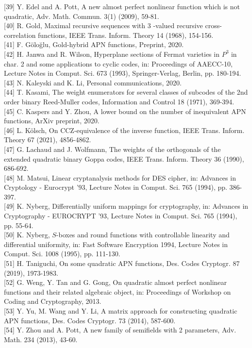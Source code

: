\documentclass[10pt]{article}
\begin{document}
[39] Y. Edel and A. Pott, A new almost perfect nonlinear function which is not quadratic, Adv. Math. Commun. 3(1) (2009), 59-81.\\[0pt]
[40] R. Gold, Maximal recursive sequences with 3 -valued recursive cross-correlation functions, IEEE Trans. Inform. Theory 14 (1968), 154-156.\\[0pt]
[41] F. Göloğlu, Gold-hybrid APN functions, Preprint, 2020.\\[0pt]
[42] H. Janwa and R. Wilson, Hyperplane sections of Fermat varieties in $P^{3}$ in char. 2 and some applications to cyclic codes, in: Proceedings of AAECC-10, Lecture Notes in Comput. Sci. 673 (1993), Springer-Verlag, Berlin, pp. 180-194.\\[0pt]
[43] N. Kaleyski and K. Li, Personal communications, 2020.\\[0pt]
[44] T. Kasami, The weight enumerators for several classes of subcodes of the 2nd order binary Reed-Muller codes, Information and Control 18 (1971), 369-394.\\[0pt]
[45] C. Kaspers and Y. Zhou, A lower bound on the number of inequivalent APN functions, ArXiv preprint, 2020.\\[0pt]
[46] L. Kölsch, On CCZ-equivalence of the inverse function, IEEE Trans. Inform. Theory 67 (2021), 4856-4862.\\[0pt]
[47] G. Lachaud and J. Wolfmann, The weights of the orthogonals of the extended quadratic binary Goppa codes, IEEE Trans. Inform. Theory 36 (1990), 686-692.\\[0pt]
[48] M. Matsui, Linear cryptanalysis methods for DES cipher, in: Advances in Cryptology - Eurocrypt '93, Lecture Notes in Comput. Sci. 765 (1994), pp. 386-397.\\[0pt]
[49] K. Nyberg, Differentially uniform mappings for cryptography, in: Advances in Cryptography - EUROCRYPT '93, Lecture Notes in Comput. Sci. 765 (1994), pp. 55-64.\\[0pt]
[50] K. Nyberg, $S$-boxes and round functions with controllable linearity and differential uniformity, in: Fast Software Encryption 1994, Lecture Notes in Comput. Sci. 1008 (1995), pp. 111-130.\\[0pt]
[51] H. Taniguchi, On some quadratic APN functions, Des. Codes Cryptogr. 87 (2019), 1973-1983.\\[0pt]
[52] G. Weng, Y. Tan and G. Gong, On quadratic almost perfect nonlinear functions and their related algebraic object, in: Proceedings of Workshop on Coding and Cryptography, 2013.\\[0pt]
[53] Y. Yu, M. Wang and Y. Li, A matrix approach for constructing quadratic APN functions, Des. Codes Cryptogr. 73 (2014), 587-600.\\[0pt]
[54] Y. Zhou and A. Pott, A new family of semifields with 2 parameters, Adv. Math. 234 (2013), 43-60.
\end{document}
